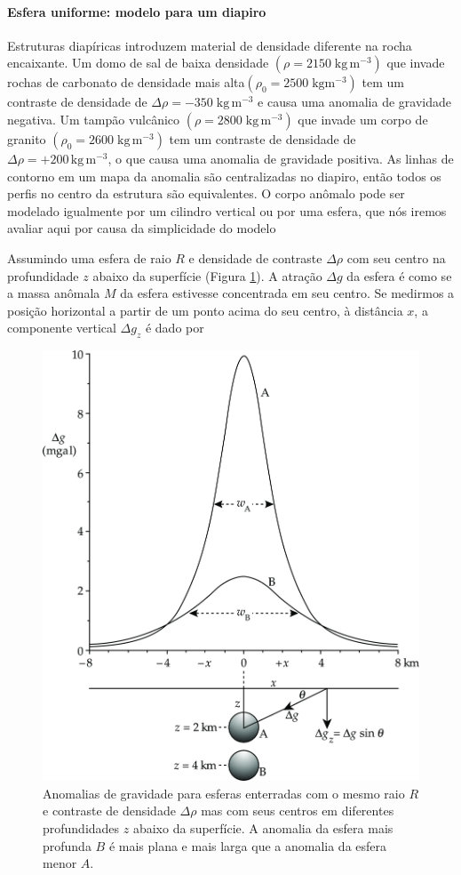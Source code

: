 \documentclass[]{book}
\let\oldparagraph\paragraph
\renewcommand{\paragraph}[1]{\oldparagraph{#1}\mbox{}}
\theoremstyle{definition}
\theoremstyle{definition}
\theoremstyle{definition}
\theoremstyle{remark}
\begin{document}
\hypertarget{esfera-uniforme-modelo-para-um-diapiro}{%
\paragraph{Esfera uniforme: modelo para um diapiro}\label{esfera-uniforme-modelo-para-um-diapiro}}

Estruturas diapíricas introduzem material de densidade diferente na rocha encaixante. Um domo de sal de baixa densidade \(\left(\rho=2150\; \mathrm{kg}\, \mathrm{m}^{-3}\right)\) que invade rochas de carbonato de densidade mais alta\(\left(\rho_0=2500\; \mathrm{kg} \mathrm{m}^{-3}\right)\) tem um contraste de densidade de \(\Delta \rho=-350\; \mathrm{kg}\,\mathrm{m}^{-3}\) e causa uma anomalia de gravidade negativa. Um tampão vulcânico \(\left(\rho=2800\; \mathrm{kg}\, \mathrm{m}^{-3}\right)\) que invade um corpo de granito \(\left(\rho_{0}=2600\; \mathrm{kg}\,\mathrm{m}^{-3}\right)\) tem um contraste de densidade de \(\Delta \rho=+200 \,\mathrm{kg}\,\mathrm{m}^{-3}\), o que causa uma anomalia de gravidade positiva. As linhas de contorno em um mapa da anomalia são centralizadas no diapiro, então todos os perfis no centro da estrutura são equivalentes. O corpo anômalo pode ser modelado igualmente por um cilindro vertical ou por uma esfera, que nós iremos avaliar aqui por causa da simplicidade do modelo

Assumindo uma esfera de raio \(R\) e densidade de contraste \(\Delta\rho\) com seu centro na profundidade \(z\) abaixo da superfície (Figura \ref{fig:esferas}). A atração \(\Delta g\) da esfera é como se a massa anômala \(M\) da esfera estivesse concentrada em seu centro. Se medirmos a posição horizontal a partir de um ponto acima do seu centro, à distância \(x\), a componente vertical \(\Delta g_z\) é dado por

\begin{figure}

{\centering \includegraphics[width=0.6\linewidth]{fig/Fig_02.42} 

}

\caption{Anomalias de gravidade para esferas enterradas com o mesmo raio $R$ e contraste de densidade $\Delta \rho$ mas com seus centros em diferentes profundidades $z$ abaixo da superfície. A anomalia da esfera mais profunda $B$ é mais plana e mais larga que a anomalia da esfera menor $A$.}\label{fig:esferas}
\end{figure}
\end{document}
